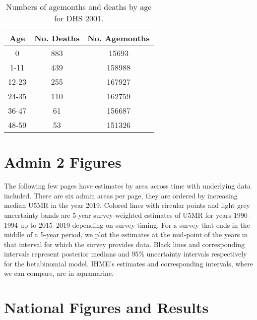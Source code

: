 \documentclass[]{article}
\begin{document}
\begin{table}[!ht]
\centering
\begin{tabular}{ccc}
  \hline
Age & No. Deaths & No. Agemonths \\ 
  \hline
0 & 883 & 15693 \\ 
  1-11 & 439 & 158988 \\ 
  12-23 & 255 & 167927 \\ 
  24-35 & 110 & 162759 \\ 
  36-47 & 61 & 156687 \\ 
  48-59 & 53 & 151326 \\ 
   \hline
\end{tabular}
\caption{Numbers of agemonths and deaths by age for DHS 2001.} 
\end{table}

\clearpage

\hypertarget{admin-2-figures}{%
\section{Admin 2 Figures}\label{admin-2-figures}}

The following few pages have estimates by area across time with
underlying data included. There are six admin areas per page, they are
ordered by increasing median U5MR in the year 2019. Colored lines with
circular points and light grey uncertainty bands are 5-year
survey-weighted estimates of U5MR for years 1990--1994 up to 2015--2019
depending on survey timing. For a survey that ends in the middle of a
5-year period, we plot the estimates at the mid-point of the years in
that interval for which the survey provides data. Black lines and
corresponding intervals represent posterior medians and 95\% uncertainty
intervals respectively for the betabinomial model. IHME's estimates and
corresponding intervals, where we can compare, are in aquamarine.



\hypertarget{national-figures-and-results}{%
\section{National Figures and
Results}\label{national-figures-and-results}}
\end{document}

